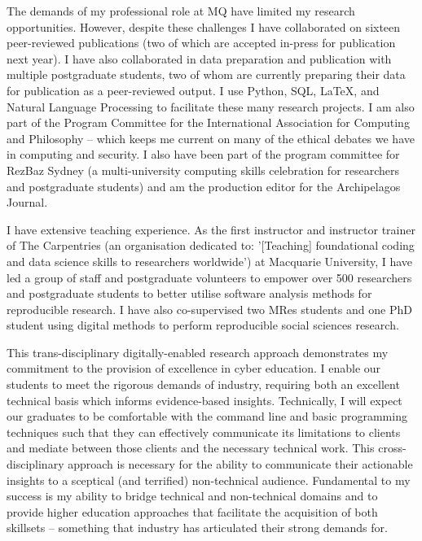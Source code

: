 \documentclass[11pt, a4paper]{awesome-cv}
\begin{document}
\begin{cvletter}
The demands of my professional role at MQ have limited my research opportunities. However, despite these challenges I have collaborated on sixteen peer-reviewed publications (two of which are accepted in-press for publication next year). I have also collaborated in data preparation and publication with multiple postgraduate students, two of whom are currently preparing their data for publication as a peer-reviewed output. I use Python, SQL, LaTeX, and Natural Language Processing to facilitate these many research projects. I am also part of the Program Committee for the International Association for Computing and Philosophy -- which keeps me current on many of the ethical debates we have in computing and security. I also have been part of the program committee for RezBaz Sydney (a multi-university computing skills celebration for researchers and postgraduate students) and am the production editor for the Archipelagos Journal. 


I have extensive teaching experience. As the first instructor and instructor trainer of The Carpentries (an organisation dedicated to: '[Teaching] foundational coding and data science skills to researchers worldwide') at Macquarie University, I have led a group of staff and postgraduate volunteers to empower over 500 researchers and postgraduate students to better utilise software analysis methods for reproducible research. I have also co-supervised two MRes students and one PhD student using digital methods to perform reproducible social sciences research. 

This trans-disciplinary digitally-enabled research approach demonstrates my commitment to the provision of excellence in cyber education. I enable our students to meet the rigorous demands of industry, requiring both an excellent technical basis which informs evidence-based insights. Technically, I will expect our graduates to be comfortable with the command line and basic programming techniques such that they can effectively communicate its limitations to clients and mediate between those clients and the necessary technical work. This cross-disciplinary approach is necessary for the ability to communicate their actionable insights to a sceptical (and terrified) non-technical audience. Fundamental to my success is my ability to bridge technical and non-technical domains and to provide higher education approaches that facilitate the acquisition of both skillsets -- something that industry has articulated their strong demands for. 


\end{cvletter}
\end{document}
